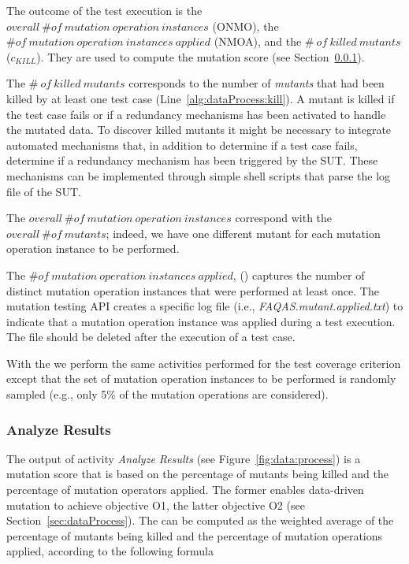 \newcommand{\ONMO}{\mathit{overall}\ \# \mathit{of}\ \mathit{mutation} \ \mathit{operation} \ \mathit{instances}}
\newcommand{\NMOA}{\# \mathit{of}\ \mathit{mutation} \ \mathit{operation}\ \mathit{instances} \ \mathit{applied}}


The outcome of the test execution is the $\ONMO$ (ONMO), the $\NMOA$ (NMOA), and the $\# \ \mathit{of}\ \mathit{killed} \ \mathit{mutants}$ ($c_{\mathit{KILL}}$). They are used to compute the mutation score (see Section~\ref{sec:analyzeResults}).

The $\# \ \mathit{of}\ \mathit{killed} \ \mathit{mutants}$ corresponds to the number of \emph{mutants} that had been killed by at least one test case (Line~\ref{alg:dataProcess:kill}). A mutant is killed if the test case fails or if a redundancy mechanisms has been activated to handle the mutated data. To discover killed mutants it might be necessary to integrate automated mechanisms that, in addition to determine if a test case fails, determine if a redundancy mechanism has been triggered by the SUT. These mechanisms can be implemented through simple shell scripts that parse the log file of the SUT.

The $\ONMO$ correspond with the $\mathit{overall}\ \# \mathit{of}\ \mathit{mutants}$; indeed, we have one different mutant for each mutation operation instance to be performed. 

The $\NMOA$, () captures the number of distinct mutation operation instances that were performed at least once. The mutation testing API creates a specific log file (i.e., \emph{FAQAS.mutant.applied.txt}) to indicate that a mutation operation instance was applied during a test execution. The file should be deleted after the execution of a test case.

With the  we perform the same activities performed for the test coverage criterion except that the set of mutation operation instances to be performed is randomly sampled (e.g., only 5\% of the mutation operations are considered).

\subsubsection{Analyze Results}
\label{sec:analyzeResults}

The output  of activity \emph{Analyze Results} (see Figure~\ref{fig:data:process}) is a mutation score that is based on
the percentage of mutants being killed and the percentage of mutation operators applied. 
The former enables data-driven mutation to achieve objective O1, the latter objective O2 (see Section~\ref{sec:dataProcess}). 
The  can be computed as the weighted average of the percentage of mutants being killed and the percentage of mutation operations applied, according to the following formula

